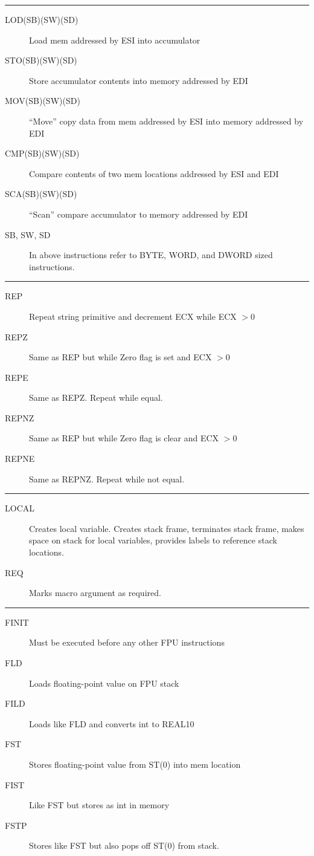 \documentclass[10pt,landscape]{article}
\newcommand{\mysep}{\vspace{0.1cm}\hrule\vspace{0.1cm}}
\begin{document}
\begin{multicols*}{3}
\mysep

\begin{description}
  \item[LOD(SB)(SW)(SD)] Load mem addressed by ESI into accumulator
  \item[STO(SB)(SW)(SD)] Store accumulator contents into memory addressed by EDI
  \item[MOV(SB)(SW)(SD)] ``Move'' copy data from mem addressed by ESI into
    memory addressed by EDI
  \item[CMP(SB)(SW)(SD)] Compare contents of two mem locations addressed by ESI 
    and EDI
  \item[SCA(SB)(SW)(SD)] ``Scan'' compare accumulator to memory addressed by EDI
  \item[SB, SW, SD] In above instructions refer to BYTE, WORD, and DWORD sized
    instructions.
\end{description}

\mysep

\begin{description}
  \item[REP] Repeat string primitive and decrement ECX while ECX $> 0$
  \item[REPZ] Same as REP but while Zero flag is set and ECX $> 0$
  \item[REPE]  Same as REPZ. Repeat while equal.
  \item[REPNZ] Same as REP but while Zero flag is clear and ECX $> 0$
  \item[REPNE] Same as REPNZ. Repeat while not equal.
\end{description}

\mysep

\begin{description}
  \item[LOCAL] Creates local variable. Creates stack frame, terminates stack
    frame, makes space on stack for local variables, provides labels to
    reference stack locations.
  \item[REQ] Marks macro argument as required.
\end{description}

\mysep

\begin{description}
  \item[FINIT] Must be executed before any other FPU instructions
  \item[FLD] Loads floating-point value on FPU stack
  \item[FILD] Loads like FLD and converts int to REAL10 
  \item[FST] Stores floating-point value from ST(0) into mem location
  \item[FIST] Like FST but stores as int in memory
  \item[FSTP] Stores like FST but also pops off ST(0) from stack.
\end{description}


\end{multicols*}
\end{document}
